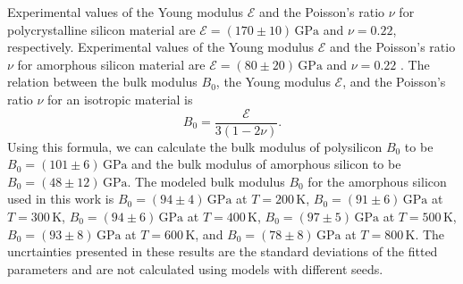 Experimental values of the Young modulus $\mathcal{E}$ and the Poisson's ratio
$\nu$ for polycrystalline silicon material are $\mathcal{E} = (170 \pm 10) \, \mathrm{GPa}$ and
$\nu = 0.22$, respectively. Experimental values of
the Young modulus $\mathcal{E}$ and the Poisson's ratio $\nu$ for amorphous
silicon material are $\mathcal{E} = (80 \pm 20) \, \mathrm{GPa}$ and $\nu = 0.22$
\cite{Freund_Suresh_2003}. The relation between the
bulk modulus $B_0$, the Young modulus $\mathcal{E}$, and the Poisson's ratio
$\nu$ for an isotropic material is
\begin{equation}
  B_0 = \frac{\mathcal{E}}{3(1 - 2\nu)}.
\end{equation}
Using this formula, we can calculate the bulk modulus of polysilicon $B_0$ to
be $B_0 = (101 \pm 6) \, \mathrm{GPa}$ and the bulk modulus of amorphous silicon
to be $B_0 = (48 \pm 12) \, \mathrm{GPa}$. The modeled bulk modulus $B_0$ for the
amorphous silicon used in this work is
$B_0 = (94 \pm 4) \, \mathrm{GPa}$ at $T = 200 \, \mathrm{K}$,
$B_0 = (91 \pm 6) \, \mathrm{GPa}$ at $T = 300 \, \mathrm{K}$,
$B_0 = (94 \pm 6) \, \mathrm{GPa}$ at $T = 400 \, \mathrm{K}$,
$B_0 = (97 \pm 5) \, \mathrm{GPa}$ at $T = 500 \, \mathrm{K}$,
$B_0 = (93 \pm 8) \, \mathrm{GPa}$ at $T = 600 \, \mathrm{K}$,
and $B_0 = (78 \pm 8) \, \mathrm{GPa}$ at $T = 800 \, \mathrm{K}$. The
uncrtainties presented in these results are the standard deviations of the
fitted parameters and are not calculated using models with different seeds.

